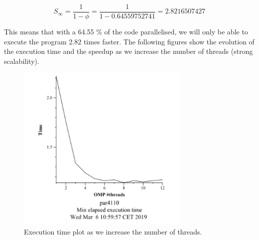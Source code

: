 \documentclass[12pt, a4paper]{article}
\begin{document}
\[S_\infty = \dfrac{1}{1 - \phi} = \dfrac{1} {1 - 0.64559752741} = 2.8216507427 \]

This means that with a 64.55 \% of the code parallelised, we will only be able to execute the program 2.82 times faster. The following figures show the evolution of the execution time and the speedup as we increase the number of threads (strong scalability).

\begin{figure}[H]
\begin{minipage}[b]{0.45\linewidth}
\centering
\includegraphics[width=\textwidth]{./images/min_v0}
\caption{Execution time plot as we increase the number of threads.}
\label{fig:min_v0}
\end{minipage}
\hspace{0.5cm}
\begin{minipage}[b]{0.45\linewidth}
\centering

\end{minipage}
\end{figure}
\end{document}
